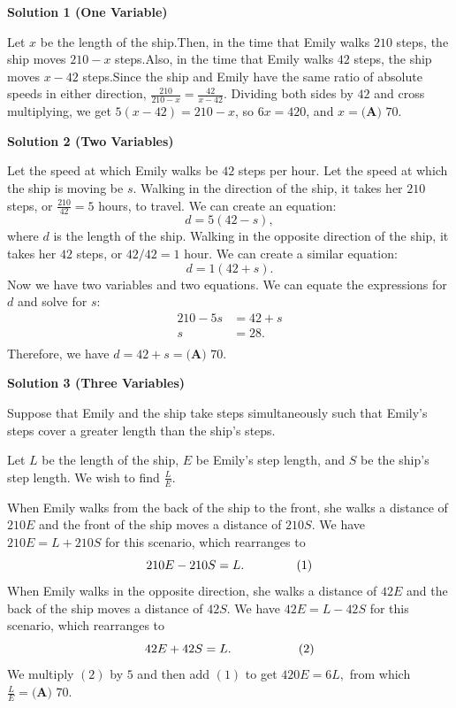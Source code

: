 \begin{enumerate}
\textbf{Solution 1 (One Variable)}

Let $x$ be the length of the ship.Then, in the time that Emily walks $210$ steps, the ship moves $210-x$ steps.Also, in the time that Emily walks $42$ steps, the ship moves $x-42$ steps.Since the ship and Emily have the same ratio of absolute speeds in either direction, $\frac{210}{210-x} = \frac{42}{x-42}$. Dividing both sides by $42$ and cross multiplying, we get $5(x-42) = 210-x$, so $6x = 420$, and $x = \boxed{\textbf{(A) }70}$.

 



\textbf{Solution 2 (Two Variables)}

Let the speed at which Emily walks be $42$ steps per hour. Let the speed at which the ship is moving be $s$. Walking in the direction of the ship, it takes her $210$ steps, or $\frac {210}{42} = 5$ hours, to travel. We can create an equation: 
 \[d = 5(42-s),\] where $d$ is the length of the ship. Walking in the opposite direction of the ship, it takes her $42$ steps, or $42/42 = 1$ hour. We can create a similar equation: 
 \[d = 1(42+s).\] Now we have two variables and two equations. We can equate the expressions for $d$ and solve for $s$:
 \begin{align*} 210-5s &= 42 + s \\ s &= 28. \\ \end{align*}
Therefore, we have $d = 42 + s = \boxed{\textbf{(A) }70}$.

 



\textbf{Solution 3 (Three Variables)}

Suppose that Emily and the ship take steps simultaneously such that Emily's steps cover a greater length than the ship's steps.

 Let $L$ be the length of the ship, $E$ be Emily's step length, and $S$ be the ship's step length. We wish to find $\frac LE.$

 When Emily walks from the back of the ship to the front, she walks a distance of $210E$ and the front of the ship moves a distance of $210S.$ We have $210E=L+210S$ for this scenario, which rearranges to 
 \[210E-210S=L. \hspace{15mm}(1)\] When Emily walks in the opposite direction, she walks a distance of $42E$ and the back of the ship moves a distance of $42S.$ We have $42E=L-42S$ for this scenario, which rearranges to 
 \[42E+42S=L. \hspace{19.125mm}(2)\]We multiply $(2)$ by $5$ and then add $(1)$ to get $420E=6L,$ from which $\frac LE = \boxed{\textbf{(A) }70}.$





\end{enumerate}
